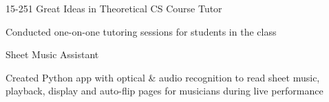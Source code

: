 
\vspace{-3.5mm}

\begin{cventries}

    \begin{multicols}{2}
  \cventry
    {} %
{15-251 Great Ideas in Theoretical CS Course Tutor} %
    {}%
    {} %
    {
      \begin{cvitems} %
      \item {{Conducted one-on-one tutoring sessions for students in the class}}
      \end{cvitems}
    }


  \cventry
    {} %
    {Sheet Music Assistant} %
    {} %
    {} %
    {
      \begin{cvitems} %
        \item {Created Python app with optical \& audio recognition to read sheet
               \newline music, playback, display and auto-flip pages for
               musicians during \newline live performance}
      \end{cvitems}
    }


\end{multicols}
\end{cventries}

